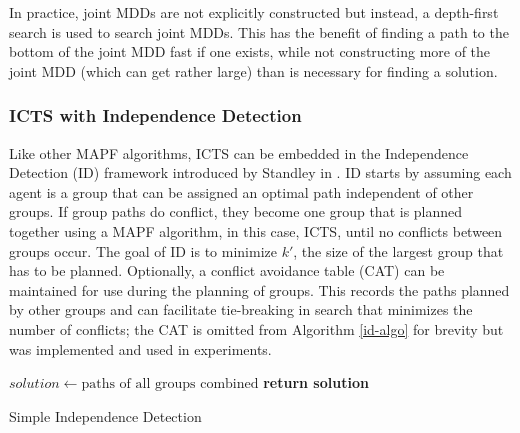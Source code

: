 \documentclass[english,10pt]{article}
\begin{document}
	In practice, joint MDDs are not explicitly constructed but instead, a depth-first search is used to search joint MDDs. This has the benefit of finding a path to the bottom of the joint MDD fast if one exists, while not constructing more of the joint MDD (which can get rather large) than is necessary for finding a solution.
	\subsubsection{ICTS with Independence Detection}
	Like other MAPF algorithms, ICTS can be embedded in the Independence Detection (ID) framework introduced by Standley in \cite{standley2010}. ID starts by assuming each agent is a group that can be assigned an optimal path independent of other groups. If group paths do conflict, they become one group that is planned together using a MAPF algorithm, in this case, ICTS, until no conflicts between groups occur. The goal of ID is to minimize $k'$, the size of the largest group that has to be planned. Optionally, a conflict avoidance table (CAT) can be maintained for use during the planning of groups. This records the paths planned by other groups and can facilitate tie-breaking in search that minimizes the number of conflicts; the CAT is omitted from Algorithm \ref{id-algo} for brevity but was implemented and used in experiments.
	\begin{algorithm}
		\begin{algorithmic}[1]
			\State {}
			\State {}
			\Repeat
			\State {}
			\State {}
			\State {}
			\State $solution\gets\text{paths of all groups combined}$
			\State \textbf{return solution}
		\end{algorithmic}
		\caption{Simple Independence Detection \cite{standley2010}} 
		\label{id-algo}
	\end{algorithm}
\end{document}
